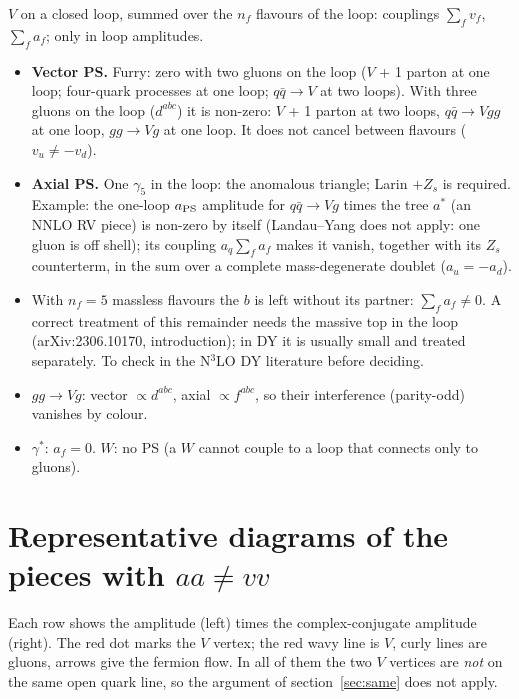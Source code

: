 \documentclass[11pt,a4paper]{article}
\newcommand{\gf}{\gamma_5}
\newcommand{\PS}{_{\rm PS}}
\begin{document}
$V$ on a closed loop, summed over the $n_f$ flavours of the loop: couplings $\sum_fv_f$, $\sum_fa_f$; only in loop
amplitudes.
\begin{itemize}
\item \textbf{Vector PS.} Furry: zero with two gluons on the loop ($V$ + 1 parton at one loop; four-quark processes at
one loop; $q\bar q\to V$ at two loops). With three gluons on the loop ($d^{abc}$) it is non-zero: $V$ + 1 parton at
two loops, $q\bar q\to Vgg$ at one loop, $gg\to Vg$ at one loop. It does not cancel between flavours ($v_u\neq-v_d$).
\item \textbf{Axial PS.} One $\gf$ in the loop: the anomalous triangle; Larin $+Z_s$ is required. Example: the
one-loop $a\PS$ amplitude for $q\bar q\to Vg$ times the tree $a^*$ (an NNLO RV piece) is non-zero by itself
(Landau--Yang does not apply: one gluon is off shell); its coupling $a_q\sum_fa_f$ makes it vanish, together with its $Z_s$
counterterm, in the sum over a complete mass-degenerate doublet ($a_u=-a_d$).
\item With $n_f=5$ massless flavours the $b$ is left without its partner: $\sum_fa_f\neq0$. A correct treatment of
this remainder needs the massive top in the loop (arXiv:2306.10170, introduction); in DY it is usually small and
treated separately. To check in the N$^3$LO DY literature before deciding.
\item $gg\to Vg$: vector $\propto d^{abc}$, axial $\propto f^{abc}$, so their interference (parity-odd) vanishes by colour.
\item $\gamma^*$: $a_f=0$. $W$: no PS (a $W$ cannot couple to a loop that connects only to gluons).
\end{itemize}


\section{Representative diagrams of the pieces with \texorpdfstring{$aa\neq vv$}{aa != vv}}\label{sec:diag}

Each row shows the amplitude (left) times the complex-conjugate amplitude (right). The red dot marks the $V$ vertex;
the red wavy line is $V$, curly lines are gluons, arrows give the fermion flow. In all of them the two $V$ vertices are
\emph{not} on the same open quark line, so the argument of section~\ref{sec:same} does not apply.
\end{document}
